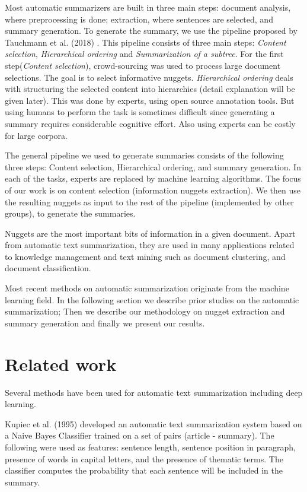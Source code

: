 \documentclass{article}
\begin{document}
Most automatic summarizers are built in three main steps: document analysis, where preprocessing is done; extraction, where sentences are selected, and summary generation. To generate the summary, we use the pipeline proposed by Tauchmann et al. (2018) \citep{Tauchmann.et.al.2018.LREC}. This pipeline consists of three main steps: \textit{Content selection}, \textit{Hierarchical ordering} and \textit{Summarization of a subtree}. For the first step(\textit{Content selection}), crowd-sourcing was used to process large document selections. The goal is to select informative nuggets. \textit{Hierarchical ordering} deals with structuring the selected content into hierarchies (detail explanation will be given later). This was done by experts, using open source annotation tools. But using humans to perform the task is sometimes difficult since generating a summary requires considerable cognitive effort. Also using experts can be costly for large corpora.

The general pipeline we used to generate summaries consists of the following three steps: Content selection, Hierarchical ordering, and summary generation. In each of the tasks, experts are replaced by machine learning algorithms. The focus of our work is on content selection (information nuggets extraction). We then use the resulting nuggets as input to the rest of the pipeline (implemented by other groups), to generate the summaries.

Nuggets are the most important bits of information in a given document. Apart from automatic text summarization, they are used in many applications related to knowledge management and text mining such as document clustering, and document classification.

Most recent methods on automatic summarization originate from the machine learning field. In the following section we describe prior studies on the automatic summarization; Then we describe our methodology on nugget extraction and summary generation and finally we present our results.



\section{Related work}
Several methods have been used for automatic text summarization including deep learning.

Kupiec et al. (1995)\citep{kupiec.et.al.1995} developed an automatic text summarization system based on a Naive Bayes Classifier trained on a set of pairs (article - summary). The following were used as features: sentence length, sentence position in paragraph, presence of words in capital letters, and the presence of thematic terms. The classifier computes the probability that each sentence will be included in the summary.
\end{document}
